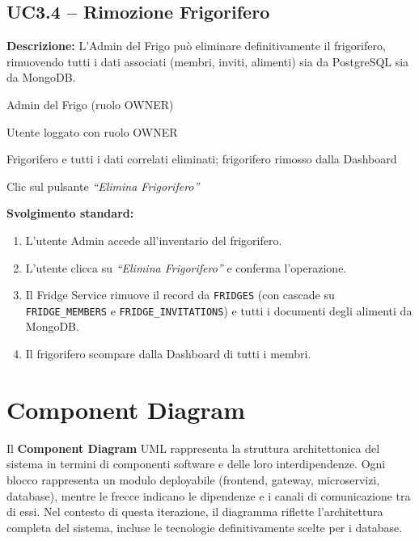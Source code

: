 \documentclass[12pt,a4paper,twoside]{report}
\newenvironment{ucbox}{%
  \begin{mdframed}[
    backgroundcolor=ucbg,
    linecolor=ucborder,
    linewidth=1pt,
    innerleftmargin=10pt,
    innerrightmargin=10pt,
    innertopmargin=8pt,
    innerbottommargin=8pt,
    roundcorner=4pt
  ]
}{%
  \end{mdframed}
}
\begin{document}
\newpage
\subsection{UC3.4 -- Rimozione Frigorifero}

\begin{ucbox}
\textbf{Descrizione:} L'Admin del Frigo può eliminare definitivamente il frigorifero, rimuovendo tutti i dati associati (membri, inviti, alimenti) sia da PostgreSQL sia da MongoDB.

\begin{description}[leftmargin=4cm, style=sameline]
  \item[Attori Coinvolti:] Admin del Frigo (ruolo OWNER)
  \item[Precondizione:] Utente loggato con ruolo OWNER
  \item[Postcondizione:] Frigorifero e tutti i dati correlati eliminati; frigorifero rimosso dalla Dashboard
  \item[Trigger:] Clic sul pulsante \textit{``Elimina Frigorifero''}
\end{description}
\end{ucbox}

\textbf{Svolgimento standard:}
\begin{enumerate}
  \item L'utente Admin accede all'inventario del frigorifero.
  \item L'utente clicca su \textit{``Elimina Frigorifero''} e conferma l'operazione.
  \item Il Fridge Service rimuove il record da \texttt{FRIDGES} (con cascade su \texttt{FRIDGE\_MEMBERS} e \texttt{FRIDGE\_INVITATIONS}) e tutti i documenti degli alimenti da MongoDB.
  \item Il frigorifero scompare dalla Dashboard di tutti i membri.
\end{enumerate}

\newpage
\section{Component Diagram}

Il \textbf{Component Diagram} UML rappresenta la struttura architettonica del sistema in termini di componenti software e delle loro interdipendenze. Ogni blocco rappresenta un modulo deployabile (frontend, gateway, microservizi, database), mentre le frecce indicano le dipendenze e i canali di comunicazione tra di essi. Nel contesto di questa iterazione, il diagramma riflette l'architettura completa del sistema, incluse le tecnologie definitivamente scelte per i database.
\end{document}
